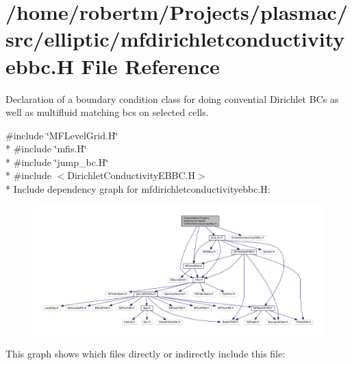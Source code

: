 \hypertarget{mfdirichletconductivityebbc_8H}{}\section{/home/robertm/\+Projects/plasmac/src/elliptic/mfdirichletconductivityebbc.H File Reference}
\label{mfdirichletconductivityebbc_8H}


Declaration of a boundary condition class for doing convential Dirichlet B\+Cs as well as multifluid matching bcs on selected cells.  


{\ttfamily \#include \char`\"{}M\+F\+Level\+Grid.\+H\char`\"{}}\\*
{\ttfamily \#include \char`\"{}mfis.\+H\char`\"{}}\\*
{\ttfamily \#include \char`\"{}jump\+\_\+bc.\+H\char`\"{}}\\*
{\ttfamily \#include $<$Dirichlet\+Conductivity\+E\+B\+B\+C.\+H$>$}\\*
Include dependency graph for mfdirichletconductivityebbc.\+H\+:\nopagebreak
\begin{figure}[H]
\begin{center}
\leavevmode
\includegraphics[width=350pt]{mfdirichletconductivityebbc_8H__incl}
\end{center}
\end{figure}
This graph shows which files directly or indirectly include this file\+:\nopagebreak
